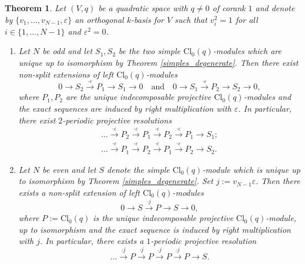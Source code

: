 \documentclass[a4paper, twoside, 11pt]{amsart}
\newtheorem{theorem}{Theorem}[section]
\theoremstyle{definition}
\theoremstyle{remark}
\numberwithin{equation}{theorem}
\newcommand{\evencl}{\mathrm{Cl}_0}
\begin{document}
\begin{theorem}\label{extensions_and_res}
    Let $(V,q)$ be a quadratic space with $q\neq 0$ of corank $1$ and denote by $\{v_1, \dots, v_{N-1}, \varepsilon\}$ an orthogonal $k$-basis for $V$ such that $v_i^2=1$ for all $i \in \{1,\dots, N-1\}$ and $\varepsilon^2 =0$.
    \begin{enumerate}[label=\roman*)]
        \item Let $N$ be odd and let $S_1,S_2$ be the two simple $\evencl(q)$-modules which are unique up to isomorphism by Theorem \ref{simples_degenerate}. Then there exist non-split extensions of left $\evencl(q)$-modules
        \begin{equation}\label{extensions_comp}
            0 \longrightarrow S_2 \overset{\cdot\varepsilon}{\longrightarrow} P_1 \longrightarrow S_1 \longrightarrow 0
            \quad \text{and} \quad 
            0 \longrightarrow S_1 \overset{\cdot\varepsilon}{\longrightarrow} P_2 \longrightarrow S_2 \longrightarrow 0,
        \end{equation}
        where $P_1,P_2$ are the unique indecomposable projective $\evencl(q)$-modules and the exact sequences are induced by right multiplication with $\varepsilon$. In particular, there exist $2$-periodic projective resolutions 
        \begin{equation}\label{projective_resolutions}
        \begin{aligned}
            \dots \overset{\cdot\varepsilon}{\longrightarrow} P_2 \overset{\cdot\varepsilon}{\longrightarrow} P_1 \overset{\cdot\varepsilon}{\longrightarrow}P_2 \overset{\cdot\varepsilon}{\longrightarrow} P_1 \longrightarrow S_1;\\
            \dots \overset{\cdot\varepsilon}{\longrightarrow} P_1\overset{\cdot\varepsilon}{\longrightarrow} P_2 \overset{\cdot\varepsilon}{\longrightarrow} P_1 \overset{\cdot\varepsilon}{\longrightarrow} P_2 \longrightarrow S_2.
        \end{aligned}
        \end{equation} 
        \item Let $N$ be even and let $S$ denote the simple $\evencl(q)$-module which is unique up to isomorphism by Theorem \ref{simples_degenerate}. Set $j := v_{N-1}\varepsilon$.
        Then there exists a non-split extension of left $\evencl(q)$-modules 
        \begin{equation}
            0 \longrightarrow S \overset{\cdot j}{\longrightarrow} P \longrightarrow S\longrightarrow 0,
        \end{equation}
        where $P := \evencl(q)$ is the unique indecomposable projective $\evencl(q)$-module, up to isomorphism and the exact sequence is induced by right multiplication with $j$. In particular, there exists a $1$-periodic projective resolution
        \begin{equation}\label{even_proj_res}
            \dots \overset{\cdot j}{\longrightarrow} P \overset{\cdot j}{\longrightarrow} P \overset{\cdot j}{\longrightarrow} P \overset{\cdot j}{\longrightarrow} P \longrightarrow S.
        \end{equation}
        \end{enumerate}
\end{theorem}
\end{document}
